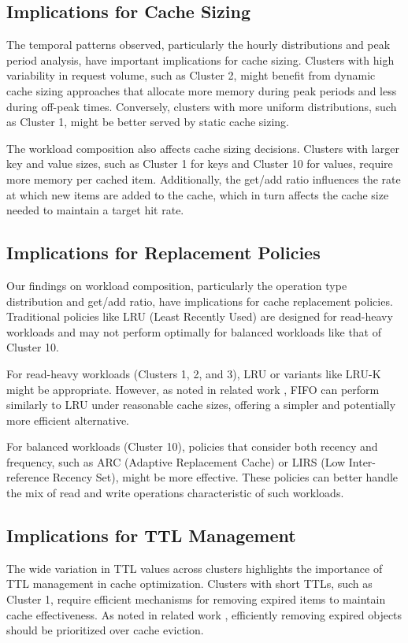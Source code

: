 \documentclass[conference]{IEEEtran}
\begin{document}
\subsection{Implications for Cache Sizing}
The temporal patterns observed, particularly the hourly distributions and peak period analysis, have important implications for cache sizing. Clusters with high variability in request volume, such as Cluster 2, might benefit from dynamic cache sizing approaches that allocate more memory during peak periods and less during off-peak times. Conversely, clusters with more uniform distributions, such as Cluster 1, might be better served by static cache sizing.

The workload composition also affects cache sizing decisions. Clusters with larger key and value sizes, such as Cluster 1 for keys and Cluster 10 for values, require more memory per cached item. Additionally, the get/add ratio influences the rate at which new items are added to the cache, which in turn affects the cache size needed to maintain a target hit rate.

\subsection{Implications for Replacement Policies}
Our findings on workload composition, particularly the operation type distribution and get/add ratio, have implications for cache replacement policies. Traditional policies like LRU (Least Recently Used) are designed for read-heavy workloads and may not perform optimally for balanced workloads like that of Cluster 10.

For read-heavy workloads (Clusters 1, 2, and 3), LRU or variants like LRU-K might be appropriate. However, as noted in related work \cite{yang2021large}, FIFO can perform similarly to LRU under reasonable cache sizes, offering a simpler and potentially more efficient alternative.

For balanced workloads (Cluster 10), policies that consider both recency and frequency, such as ARC (Adaptive Replacement Cache) or LIRS (Low Inter-reference Recency Set), might be more effective. These policies can better handle the mix of read and write operations characteristic of such workloads.

\subsection{Implications for TTL Management}
The wide variation in TTL values across clusters highlights the importance of TTL management in cache optimization. Clusters with short TTLs, such as Cluster 1, require efficient mechanisms for removing expired items to maintain cache effectiveness. As noted in related work \cite{yang2021large}, efficiently removing expired objects should be prioritized over cache eviction.
\end{document}
